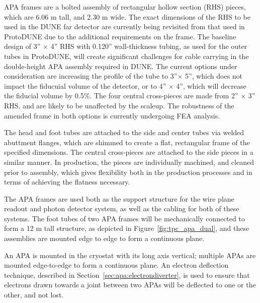APA frames are a bolted assembly of rectangular hollow section (RHS) pieces,
which are 6.06 m tall, and 2.30 m wide.  The exact dimensions of the RHS to be used in the DUNE far detector are currently being revisited from that used in ProtoDUNE due to the additional requirements on the frame.  The baseline design of 3'' $\times$ 4'' RHS with 0.120'' wall-thickness tubing, as used for the outer tubes in ProtoDUNE, will create significant challenges for cable carrying in the double-height APA assembly required in DUNE.  The current options under consideration are increasing the profile of the tube to 3''$\times$ 5'', which does not impact the fiducuial volume of the detector, or to 4'' $\times$ 4'', which will decrease the fiducial volume by 0.5$\%$.  The four central cross-pieces are made from 2'' $\times$ 3'' RHS, and are likely to be unaffected by the scaleup.  The robustness of the amended frame in both options is currently undergoing FEA analysis.  

The head and foot tubes are attached to the side and center tubes via welded abuttment flanges, which are shimmed to create a flat, rectangular frame of the specified dimensions.  The central cross-pieces are attached to the side pieces in a similar manner.  In production, the pieces are individually machined, and cleaned prior to assembly, which gives flexibility both in the production processes and in terms of achieving the flatness necessary.  

The APA frames are used both as the support structure for the wire plane
readout and photon detector system, as well as the cabling for both of these
systems. The foot tubes of two APA frames will be mechanically connected to
form a 12 m tall structure, as depicted in Figure~\ref{fig:tpc_apa_dual}, and these assemblies are mounted edge to edge to form a continuous plane.  


An APA is mounted in the cryostat with its long axis vertical; multiple APAs are mounted edge-to-edge to form a continuous plane. An electron deflection technique, described in Section~\ref{sec:apa:electrondiverter}, is used to ensure that electrons drawn towards a joint between two APAs will be deflected to one or the other, and not lost.


